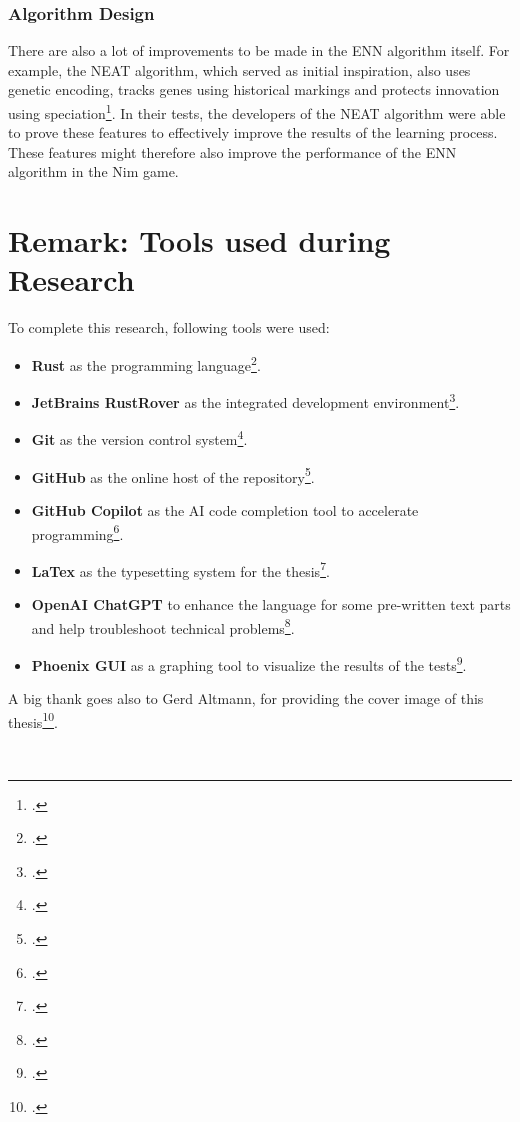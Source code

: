 \subsubsection{Algorithm Design}
There are also a lot of improvements to be made in the ENN algorithm itself.
For example, the NEAT algorithm, which served as initial inspiration, also uses genetic encoding, tracks genes using historical markings and protects innovation using speciation\footcite{Neat_02}.
In their tests, the developers of the NEAT algorithm were able to prove these features to effectively improve the results of the learning process.
These features might therefore also improve the performance of the ENN algorithm in the Nim game.

\section{Remark: Tools used during Research}
To complete this research, following tools were used:
\begin{itemize}
    \item \textbf{Rust} as the programming language\footcite{rust23}.
    \item \textbf{JetBrains RustRover} as the integrated development environment\footcite{rustrover}.
    \item \textbf{Git} as the version control system\footcite{git}.
    \item \textbf{GitHub} as the online host of the repository\footcite{github}.
    \item \textbf{GitHub Copilot} as the AI code completion tool to accelerate programming\footcite{github_copilot2021}.
    \item \textbf{LaTex} as the typesetting system for the thesis\footcite{latex}.
    \item \textbf{OpenAI ChatGPT} to enhance the language for some pre-written text parts and help troubleshoot technical problems\footcite{chatgpt}.
    \item \textbf{Phoenix GUI} as a graphing tool to visualize the results of the tests\footcite{phoenixgui}.
\end{itemize}
A big thank goes also to Gerd Altmann, for providing the cover image of this thesis\footcite{pixabay_neuronen}.
\cleardoublepage %
\printbibliography[title=References]
\\
